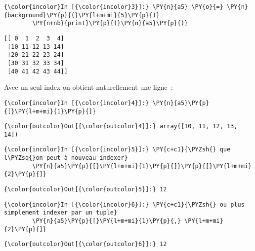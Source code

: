     \begin{Verbatim}[commandchars=\\\{\}]
{\color{incolor}In [{\color{incolor}3}]:} \PY{n}{a5} \PY{o}{=} \PY{n}{background}\PY{p}{(}\PY{l+m+mi}{5}\PY{p}{)}
        \PY{n+nb}{print}\PY{p}{(}\PY{n}{a5}\PY{p}{)}
\end{Verbatim}


    \begin{Verbatim}[commandchars=\\\{\}]
[[ 0  1  2  3  4]
 [10 11 12 13 14]
 [20 21 22 23 24]
 [30 31 32 33 34]
 [40 41 42 43 44]]

    \end{Verbatim}

    Avec un seul index on obtient naturellement une ligne~:

    \begin{Verbatim}[commandchars=\\\{\}]
{\color{incolor}In [{\color{incolor}4}]:} \PY{n}{a5}\PY{p}{[}\PY{l+m+mi}{1}\PY{p}{]}
\end{Verbatim}


\begin{Verbatim}[commandchars=\\\{\}]
{\color{outcolor}Out[{\color{outcolor}4}]:} array([10, 11, 12, 13, 14])
\end{Verbatim}
            
    \begin{Verbatim}[commandchars=\\\{\}]
{\color{incolor}In [{\color{incolor}5}]:} \PY{c+c1}{\PYZsh{} que l\PYZsq{}on peut à nouveau indexer}
        \PY{n}{a5}\PY{p}{[}\PY{l+m+mi}{1}\PY{p}{]}\PY{p}{[}\PY{l+m+mi}{2}\PY{p}{]}
\end{Verbatim}


\begin{Verbatim}[commandchars=\\\{\}]
{\color{outcolor}Out[{\color{outcolor}5}]:} 12
\end{Verbatim}
            
    \begin{Verbatim}[commandchars=\\\{\}]
{\color{incolor}In [{\color{incolor}6}]:} \PY{c+c1}{\PYZsh{} ou plus simplement indexer par un tuple}
        \PY{n}{a5}\PY{p}{[}\PY{l+m+mi}{1}\PY{p}{,} \PY{l+m+mi}{2}\PY{p}{]}
\end{Verbatim}


\begin{Verbatim}[commandchars=\\\{\}]
{\color{outcolor}Out[{\color{outcolor}6}]:} 12
\end{Verbatim}
            
